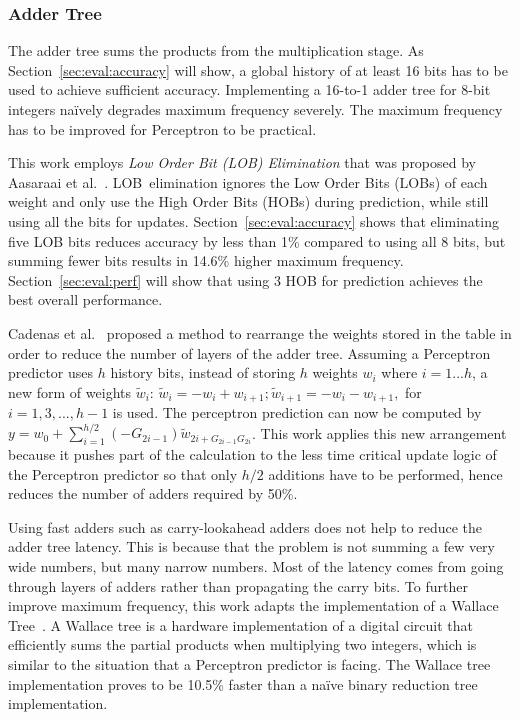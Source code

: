 \documentclass[conference]{IEEEtran}
\begin{document}
\subsubsection{Adder Tree}
\label{sec:fpga:perceptron:adder}
The adder tree sums the products from the multiplication stage. As Section~\ref{sec:eval:accuracy} will show, a global history of at least 16 bits has to be used to achieve sufficient accuracy. Implementing a 16-to-1 adder tree for 8-bit integers na\"ively degrades maximum frequency severely. The maximum frequency has to be improved for Perceptron to be practical.

This work employs \textit{Low Order Bit (LOB) Elimination} that was proposed by Aasaraai et al.~\cite{lob}. LOB\ elimination ignores the Low Order Bits (LOBs) of each weight and only use the High Order Bits (HOBs) during prediction, while still using all the bits for updates. Section~\ref{sec:eval:accuracy} shows that eliminating five LOB bits reduces accuracy by less than 1\% compared to using all 8 bits, but summing fewer bits results in 14.6\% higher maximum frequency. Section~\ref{sec:eval:perf} will show that using 3 HOB for prediction achieves the best overall performance.

Cadenas et al.~\cite{perceptronRearrange} proposed a method to rearrange the weights stored in the table in order to reduce the number of layers of the adder tree. Assuming a Perceptron predictor uses $h$ history bits, instead of storing $h$ weights $w_i$ where $i = 1 ... h$, a new form of weights $\widetilde{w}_i$: $\widetilde{w}_i = - w_i + w_{i+1}; \widetilde{w}_{i+1} = - w_i - w_{i+1},$ for $i = 1, 3, ..., h-1$ is used. The perceptron prediction can now be computed by $y = w_0 + \sum_{i=1}^{h/2}(-G_{2i-1})\widetilde{w}_{2i+G_{2i-1}G_{2i}}$. This work applies this new arrangement because it pushes part of the calculation to the less time critical update logic of the Perceptron predictor so that only $h/2$ additions have to be performed, hence reduces the number of adders required by 50\%.

Using fast adders such as carry-lookahead adders does not help to reduce the adder tree latency. This is because that the problem is not summing a few very wide numbers, but many narrow numbers. Most of the latency comes from going through layers of adders rather than propagating the carry bits. To further improve maximum frequency, this work adapts the implementation of a Wallace Tree~\cite{wallacetree}. A Wallace tree is a hardware implementation of a digital circuit that efficiently sums the partial products when multiplying two integers, which is similar to the situation that a Perceptron predictor is facing. The Wallace tree implementation proves to be 10.5\% faster than a na\"ive binary reduction tree implementation. 
\end{document}
